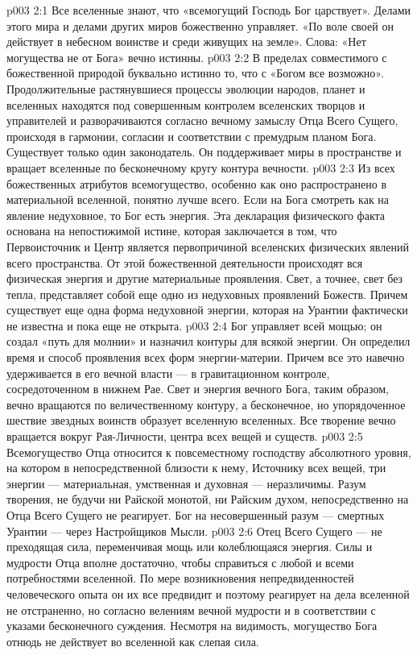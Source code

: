 \vs p003 2:1 Все вселенные знают, что «всемогущий Господь Бог царствует». Делами этого мира и делами других миров божественно управляет. «По воле своей он действует в небесном воинстве и среди живущих на земле». Слова: «Нет могущества не от Бога» вечно истинны.
\vs p003 2:2 В пределах совместимого с божественной природой буквально истинно то, что с «Богом все возможно». Продолжительные растянувшиеся процессы эволюции народов, планет и вселенных находятся под совершенным контролем вселенских творцов и управителей и разворачиваются согласно вечному замыслу Отца Всего Сущего, происходя в гармонии, согласии и соответствии с премудрым планом Бога. Существует только один законодатель. Он поддерживает миры в пространстве и вращает вселенные по бесконечному кругу контура вечности.
\vs p003 2:3 Из всех божественных атрибутов всемогущество, особенно как оно распространено в материальной вселенной, понятно лучше всего. Если на Бога смотреть как на явление недуховное, то Бог есть энергия. Эта декларация физического факта основана на непостижимой истине, которая заключается в том, что Первоисточник и Центр является первопричиной вселенских физических явлений всего пространства. От этой божественной деятельности происходят вся физическая энергия и другие материальные проявления. Свет, а точнее, свет без тепла, представляет собой еще одно из недуховных проявлений Божеств. Причем существует еще одна форма недуховной энергии, которая на Урантии фактически не известна и пока еще не открыта.
\vs p003 2:4 Бог управляет всей мощью; он создал «путь для молнии» и назначил контуры для всякой энергии. Он определил время и способ проявления всех форм энергии\hyp{}материи. Причем все это навечно удерживается в его вечной власти --- в гравитационном контроле, сосредоточенном в нижнем Рае. Свет и энергия вечного Бога, таким образом, вечно вращаются по величественному контуру, а бесконечное, но упорядоченное шествие звездных воинств образует вселенную вселенных. Все творение вечно вращается вокруг Рая\hyp{}Личности, центра всех вещей и существ.
\vs p003 2:5 Всемогущество Отца относится к повсеместному господству абсолютного уровня, на котором в непосредственной близости к нему, Источнику всех вещей, три энергии --- материальная, умственная и духовная --- неразличимы. Разум творения, не будучи ни Райской монотой, ни Райским духом, непосредственно на Отца Всего Сущего не реагирует. Бог  на несовершенный разум --- смертных Урантии --- через Настройщиков Мысли.
\vs p003 2:6 \pc Отец Всего Сущего --- не преходящая сила, переменчивая мощь или колеблющаяся энергия. Силы и мудрости Отца вполне достаточно, чтобы справиться с любой и всеми потребностями вселенной. По мере возникновения непредвиденностей человеческого опыта он их все предвидит и поэтому реагирует на дела вселенной не отстраненно, но согласно велениям вечной мудрости и в соответствии с указами бесконечного суждения. Несмотря на видимость, могущество Бога отнюдь не действует во вселенной как слепая сила.
